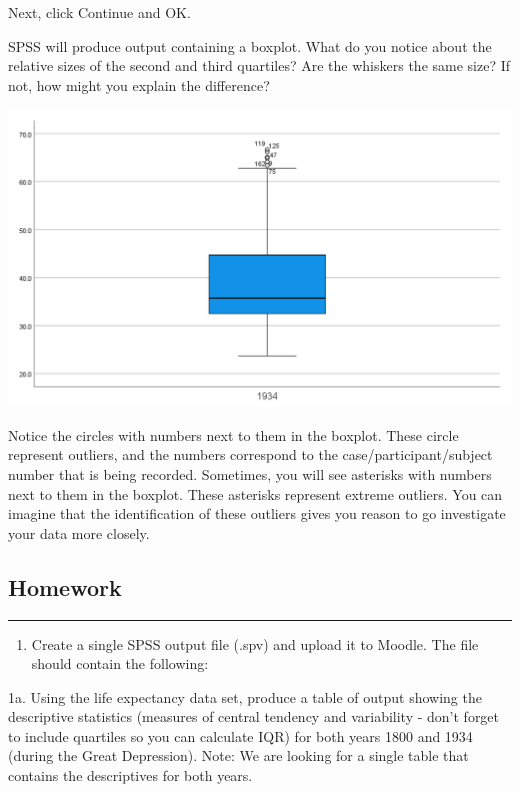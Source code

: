 \documentclass[
]{book}
\providecommand{\tightlist}{%
  \setlength{\itemsep}{0pt}\setlength{\parskip}{0pt}}
\begin{document}
Next, click {Continue} and {OK}.

SPSS will produce output containing a boxplot. What do you notice about the relative sizes of the second and third quartiles? Are the whiskers the same size? If not, how might you explain the difference?

\includegraphics{img/2.4.33.png}

Notice the circles with numbers next to them in the boxplot. These circle represent outliers, and the numbers correspond to the case/participant/subject number that is being recorded. Sometimes, you will see asterisks with numbers next to them in the boxplot. These asterisks represent extreme outliers. You can imagine that the identification of these outliers gives you reason to go investigate your data more closely.

\hypertarget{homework-3}{%
\subsection{Homework}\label{homework-3}}

\begin{center}\rule{0.5\linewidth}{0.5pt}\end{center}

\begin{enumerate}
\def\labelenumi{\arabic{enumi}.}
\tightlist
\item
  Create a single SPSS output file (.spv) and upload it to Moodle. The file should contain the following:
\end{enumerate}

1a. Using the life expectancy data set, produce a table of output showing the descriptive statistics (measures of central tendency and variability - don't forget to include quartiles so you can calculate IQR) for both years 1800 and 1934 (during the Great Depression). Note: We are looking for a single table that contains the descriptives for both years.
\end{document}
